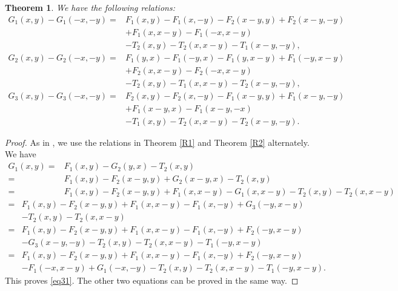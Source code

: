 \documentclass[reqno]{amsart}
\newtheorem{theorem}{Theorem}[section]
\theoremstyle{definition}
\theoremstyle{remark}
\numberwithin{equation}{section}
\begin{document}
\begin{theorem}
\label{R3}We have the following relations:
\begin{equation}\label{eq31}\begin{split}
G_1(x,y)-G_1(-x,-y)=&F_1(x,y)-F_1(x,-y)-F_2(x-y,y)+F_2(x-y, -y)\\&+F_1(x,x-y)-F_1(-x,x-y)\\&-T_2(x,y)-T_2(x,x-y)-T_1(x-y,-y),
\end{split}\end{equation}
\begin{equation}\label{eq32}\begin{split}
G_2(x,y)-G_2(-x,-y)=&F_1(y,x)-F_1(-y,x)-F_1(y,x-y)+F_1(-y,x-y)\\&+F_2( x, x-y)-F_2(-x,x-y)\\&-T_2(x,y)-T_1(x,x-y)-T_2(x-y,-y),
\end{split}\end{equation}
\begin{equation}\label{eq33}\begin{split}
G_3(x,y)-G_3(-x,-y)=&F_2(x,y)-F_2(x,-y)-F_1(x-y,y)+F_1(x-y, -y)\\
&+F_1(x-y, x)-F_1(x-y, -x)\\&-T_1(x,y)-T_2(x,x-y)-T_2(x-y,-y).
\end{split}\end{equation}
\end{theorem}

\begin{proof}As in \cite{1}, we use the relations in Theorem \ref{R1} and Theorem \ref{R2} alternately. We have
\begin{align*}
G_1(x,y)=&F_1(x,y)-G_2(y,x)-T_2(x,y)\\
=&F_1(x,y)-F_2(x-y, y)+G_2(x-y,x)-T_2(x,y)\\
=&F_1(x,y)-F_2( x-y, y)+F_1(x, x-y)-G_1(x,x-y)-T_2(x,y)-T_2(x, x-y)\end{align*}\begin{align*}
=&F_1(x,y)-F_2( x-y, y)+F_1(x, x-y)-F_1(x,-y)+G_3(-y,x-y)\\
&-T_2(x,y)-T_2(x, x-y)\\
=&F_1(x,y)-F_2( x-y, y)+F_1(x, x-y)-F_1(x,-y)+F_2(-y,x-y)\\
&-G_3(x-y, -y)-T_2(x,y)-T_2(x, x-y)-T_1(-y, x-y)\\
=&F_1(x,y)-F_2( x-y, y)+F_1(x, x-y)-F_1(x,-y)+F_2(-y,x-y)\\
&-F_1(-x,x-y)+G_1(-x,-y)-T_2(x,y)-T_2(x, x-y)-T_1(-y, x-y).
\end{align*}
This proves   \eqref{eq31}. The other two equations can be proved in the same way.
\end{proof}
\end{document}

